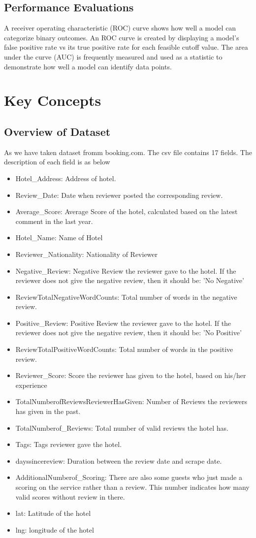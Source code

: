 \subsection{Performance Evaluations }

A receiver operating characteristic (ROC) curve shows how well a model can categorize binary outcomes. An ROC curve is created by displaying a model's false positive rate vs its true positive rate for each feasible cutoff value. The area under the curve (AUC) is frequently measured and used as a statistic to demonstrate how well a model can identify data points. 
\section{Key Concepts}
\subsection{Overview of Dataset}
As we have taken dataset fromm booking.com. The csv file contains 17 fields. The description of each field is as below
\begin{itemize}
\item Hotel\_Address: Address of hotel.
\item Review\_Date: Date when reviewer posted the corresponding review.
\item Average\_Score: Average Score of the hotel, calculated based on the latest comment in the last year.
\item Hotel\_Name: Name of Hotel
\item Reviewer\_Nationality: Nationality of Reviewer
\item Negative\_Review: Negative Review the reviewer gave to the hotel. If the reviewer does not give the negative review, then it should be: 'No Negative'
\item ReviewTotalNegativeWordCounts: Total number of words in the negative review.
\item Positive\_Review: Positive Review the reviewer gave to the hotel. If the reviewer does not give the negative review, then it should be: 'No Positive'
\item ReviewTotalPositiveWordCounts: Total number of words in the positive review.
\item Reviewer\_Score: Score the reviewer has given to the hotel, based on his/her experience
\item TotalNumberofReviewsReviewerHasGiven: Number of Reviews the reviewers has given in the past.
\item TotalNumberof\_Reviews: Total number of valid reviews the hotel has.
\item Tags: Tags reviewer gave the hotel.
\item dayssincereview: Duration between the review date and scrape date.
\item AdditionalNumberof\_Scoring: There are also some guests who just made a scoring on the service rather than a review. This number indicates how many valid scores without review in there.
\item lat: Latitude of the hotel
\item lng: longitude of the hotel
\end{itemize}
